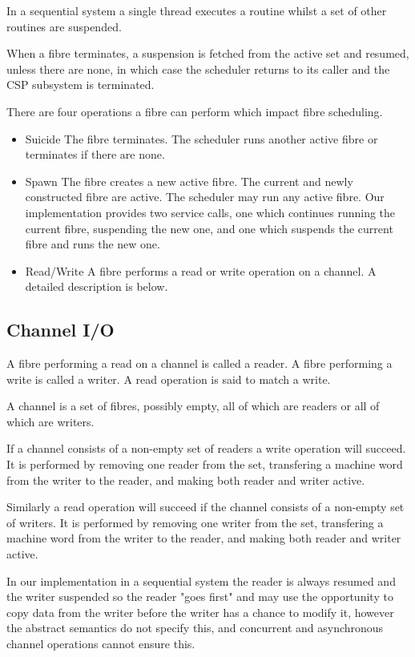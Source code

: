 \documentclass[oneside]{book}
\begin{document}
In a sequential system a single thread executes a routine whilst a set of other 
routines are suspended.

When a fibre terminates, a suspension is fetched from the active set and
resumed, unless there are none, in which case the scheduler returns to its caller
and the CSP subsystem is terminated.

There are four operations a fibre can perform which impact fibre scheduling.

\begin{itemize}

\item{Suicide} The fibre terminates. The scheduler runs another active fibre or terminates
if there are none.

\item{Spawn} The fibre creates a new active fibre. The current and newly constructed
fibre are active. The scheduler may run any active fibre. Our implementation provides
two service calls, one which continues running the current fibre, suspending the
new one, and one which suspends the current fibre and runs the new one.

\item{Read/Write} A fibre performs a read or write operation on a channel.
A detailed description is below.

\end{itemize}

\subsection{Channel I/O}
A fibre performing a read on a channel is called a reader. A fibre performing
a write is called a writer. A read operation is said to match a write.

A channel is a set of fibres, possibly empty, all of which are
readers or all of which are writers.

If a channel consists of a non-empty set of readers a write operation will succeed.
It is performed by removing one reader from the set, transfering a machine word
from the writer to the reader, and making both reader and writer active.

Similarly a read operation will succeed if the channel consists of a non-empty
set of writers. It is performed by removing one writer from the set, transfering
a machine word from the writer to the reader, and making both reader and writer active.

In our implementation in a sequential system the reader is always resumed and the
writer suspended so the reader "goes first" and may use the opportunity to copy
data from the writer before the writer has a chance to modify it, however the
abstract semantics do not specify this, and concurrent and asynchronous channel
operations cannot ensure this.
\end{document}
